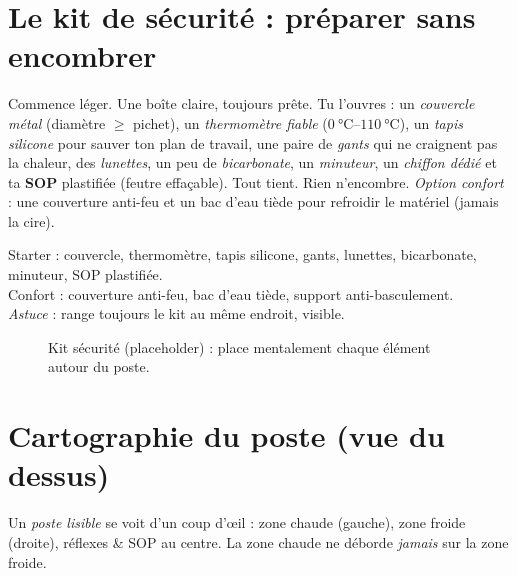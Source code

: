 \documentclass[../../main.tex]{subfiles}
\begin{document}
\section{Le kit de sécurité : préparer sans encombrer}

Commence léger. Une boîte claire, toujours prête. Tu l’ouvres :
un \textit{couvercle métal} (diamètre \(\geq\) pichet), un \textit{thermomètre fiable} (\(\SIrange{0}{110}{\celsius}\)), un \textit{tapis silicone} pour sauver ton plan de travail, une paire de \textit{gants} qui ne craignent pas la chaleur, des \textit{lunettes}, un peu de \textit{bicarbonate}, un \textit{minuteur}, un \textit{chiffon dédié} et ta \textbf{SOP} plastifiée (feutre effaçable).
Tout tient. Rien n’encombre. \textit{Option confort} : une couverture anti-feu et un bac d’eau tiède pour refroidir le matériel (jamais la cire).

\begin{BlocMateriel}
Starter : couvercle, thermomètre, tapis silicone, gants, lunettes, bicarbonate, minuteur, SOP plastifiée. \\
Confort : couverture anti-feu, bac d’eau tiède, support anti-basculement. \\
\textit{Astuce} : range toujours le kit au même endroit, visible.
\end{BlocMateriel}

\begin{figure}[!h]
  \centering
  \fbox{\rule{0pt}{0.28\textheight}\rule{0.9\textwidth}{0pt}}
  \caption{Kit sécurité (placeholder) : place mentalement chaque élément autour du poste.}
\end{figure}

\section{Cartographie du poste (vue du dessus)}

Un \textit{poste lisible} se voit d’un coup d’œil : \textcolor{red!60!black}{zone chaude} (gauche), \textcolor{blue!70!black}{zone froide} (droite), \textcolor{green!50!black}{réflexes \& SOP} au centre. La zone chaude ne déborde \textit{jamais} sur la zone froide.
\end{document}

